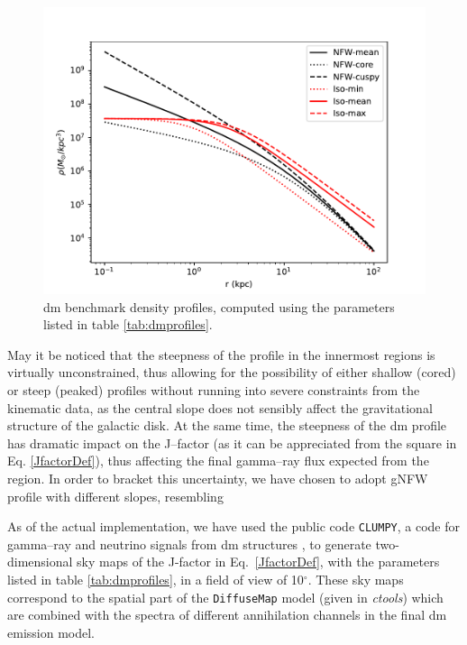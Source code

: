 \documentclass{article}
\begin{document}
\begin{figure}
        \centering  
        \includegraphics[scale=0.7]{Pictures/dmprofiles.pdf}
        \caption{\label{fig:dmdensity} \gls{dm} benchmark density profiles, computed using the parameters listed in table \ref{tab:dmprofiles}.} 
\end{figure}


May it be noticed that the steepness of the profile in the innermost regions is virtually unconstrained, thus allowing for the possibility of either shallow (cored) or steep (peaked) profiles without running into severe constraints from the kinematic data, as the central slope does not sensibly affect the gravitational structure of the galactic disk. At the same time, the steepness of the \gls{dm} profile has dramatic impact on the J--factor (as it can be appreciated from the square in Eq. \ref{JfactorDef}), thus affecting the final gamma--ray flux expected from the region. In order to bracket this uncertainty, we have chosen to adopt gNFW profile with different slopes, resembling

\par As of the actual implementation, we have used the public code {\tt CLUMPY}, a code for gamma--ray and neutrino signals from \gls{dm} structures \cite{2012CoPhC.183..656C, 2016CoPhC.200..336B, 2019CoPhC.235..336H}, to generate two-dimensional sky maps of the J-factor in Eq.~\eqref{JfactorDef}, with the parameters listed in table \ref{tab:dmprofiles}, in a field of view of 10$^{\circ}$. These sky maps correspond to the spatial part of the {\tt DiffuseMap} model (given in {\it ctools}) which are combined with the spectra of different annihilation channels in the final \gls{dm} emission model.
\end{document}
